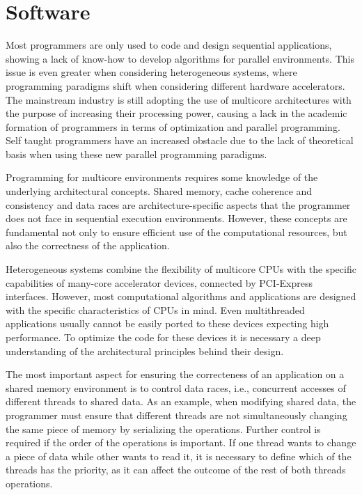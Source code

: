\section{Software}
\label{Software}

Most programmers are only used to code and design sequential applications, showing a lack of know-how to develop algorithms for parallel environments. This issue is even greater when considering heterogeneous systems, where programming paradigms shift when considering different hardware accelerators. The mainstream industry is still adopting the use of multicore architectures with the purpose of increasing their processing power, causing a lack in the academic formation of programmers in terms of optimization and parallel programming. Self taught programmers have an increased obstacle due to the lack of theoretical basis when using these new parallel programming paradigms.

Programming for multicore environments requires some knowledge of the underlying architectural concepts. Shared memory, cache coherence and consistency and data races are architecture-specific aspects that the programmer does not face in sequential execution environments. However, these concepts are fundamental not only to ensure efficient use of the computational resources, but also the correctness of the application.

Heterogeneous systems combine the flexibility of multicore CPUs with the specific capabilities of many-core accelerator devices, connected by PCI-Express interfaces. However, most computational algorithms and applications are designed with the specific characteristics of CPUs in mind. Even multithreaded applications usually cannot be easily ported to these devices expecting high performance. To optimize the code for these devices it is necessary a deep understanding of the architectural principles behind their design.

The most important aspect for ensuring the correcteness of an application on a shared memory environment is to control data races, i.e., concurrent accesses of different threads to shared data. As an example, when modifying shared data, the programmer must ensure that different threads are not simultaneously changing the same piece of memory by serializing the operations. Further control is required if the order of the operations is important. If one thread wants to change a piece of data while other wants to read it, it is necessary to define which of the threads has the priority, as it can affect the outcome of the rest of both threads operations.

